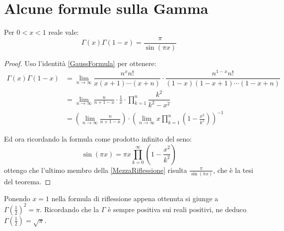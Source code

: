 \section{Alcune formule sulla Gamma}

\begin{theorem} \label{Riflessione}
	Per $0<x<1$ reale vale:
	\begin{equation*}
		\Gamma(x)\Gamma(1-x)=\frac{\pi}{\sin(\pi x)}
	\end{equation*}
\end{theorem}
\begin{proof}
	Uso l'identità \cref{GaussFormula} per ottenere:
	\begin{equation}\begin{split} \label{MezzaRiflessione}
		\Gamma(x)\Gamma(1-x) & = \lim_{n\to\infty} \dfrac{n^xn!}{x(x+1)\cdots (x+n)} \cdot 
		\dfrac{n^{1-x}n!}{(1-x)(1-x+1)\cdots (1-x+n)}\\
		& =\lim_{n\to\infty} \frac{n}{n+1-x} \cdot \frac{1}{x} \cdot \prod_{k=1}^{n}\dfrac{k^2}{k^2-x^2} \\
		& =\left(\lim_{n\to\infty} \frac{n}{n+1-x} \right) \cdot 
		\left( \lim_{n\to\infty} x \prod_{k=1}^{n}\left(1-\frac{x^2}{k^2}\right) \right)^{-1}
	\end{split}\end{equation}

	Ed ora ricordando la formula come prodotto infinito del seno:
	\begin{equation*}
		\sin(\pi x)=\pi x \prod_{k=0}^{\infty} \left(1-\frac{x^2}{k^2}\right)
	\end{equation*}
	ottengo che l'ultimo membro della \cref{MezzaRiflessione} risulta $\frac{\pi}{\sin(\pi x)}$, che è la tesi del teorema.
\end{proof}

\begin{remark}
	Ponendo $x=1$ nella formula di riflessione appena ottenuta si giunge a $\Gamma\left(\frac12\right)^2=\pi$. 
	Ricordando che la $\Gamma$ è sempre positiva sui reali positivi, ne deduco $\Gamma\left(\frac12\right)=\sqrt\pi$.
\end{remark}



